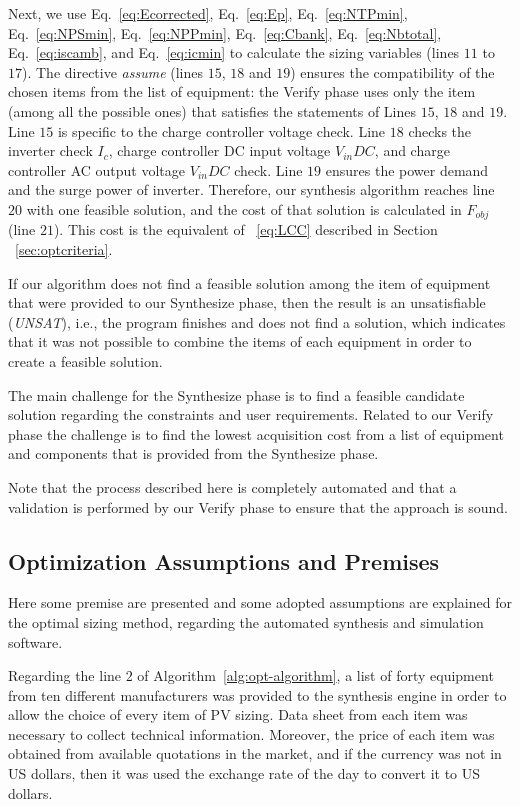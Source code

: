 Next, we use Eq.~\eqref{eq:Ecorrected}, Eq.~\eqref{eq:Ep}, Eq.~\eqref{eq:NTPmin}, 
Eq.~\eqref{eq:NPSmin}, Eq.~\eqref{eq:NPPmin}, Eq.~\eqref{eq:Cbank}, 
Eq.~\eqref{eq:Nbtotal}, Eq.~\eqref{eq:iscamb}, and Eq.~\eqref{eq:icmin} to calculate the sizing variables (lines $11$ to $17$). The directive \textit{assume} (lines $15$, $18$ and $19$) 
ensures the compatibility of the chosen items from the list of equipment: the {\sc Verify} phase 
uses only the item (among all the possible ones) that satisfies the statements of Lines $15$, $18$ and $19$. Line $15$ is specific to the charge controller voltage check. Line $18$ checks the inverter check $I_{c}$, charge controller DC input voltage $V_{in}DC$, and charge controller AC output voltage $V_{in}DC$ check. Line $19$ ensures the power demand and the surge power of inverter.
Therefore, our synthesis algorithm reaches line $20$ with one feasible solution, 
and the cost of that solution is calculated in $F_{obj}$ (line $21$). This cost is the equivalent of ~\ref{eq:LCC} described in Section ~\ref{sec:optcriteria}.

If our algorithm does not find a feasible solution among the item of equipment that 
were provided to our {\sc Synthesize} phase,  then the result is an unsatisfiable (\textit{UNSAT}), i.e., 
the program finishes and does not find a solution, which indicates that it 
was not possible to combine the items of each equipment in order to create a feasible solution. 

The main challenge for the {\sc Synthesize} phase is to find a feasible candidate 
solution regarding the constraints and user requirements. Related to our {\sc Verify} 
phase the challenge is to find the lowest acquisition cost from a list of equipment and 
components that is provided from the {\sc Synthesize} phase. 

Note that the process described here is completely automated and that a validation is performed 
by our {\sc Verify} phase to ensure that the approach is sound.

\subsection{Optimization Assumptions and Premises}
\label{sec:OptAssumptions}

Here some premise are presented and some adopted assumptions are explained for the optimal sizing method, regarding the automated synthesis and simulation software.

Regarding the line $2$ of Algorithm~\ref{alg:opt-algorithm}, 
a list of forty equipment from ten different manufacturers was provided 
to the synthesis engine in order to allow the choice of every item 
of PV sizing. Data sheet from each item was necessary to collect 
technical information. Moreover, the price of each item was obtained 
from available quotations in the market, and if the currency was not in US dollars, 
then it was used the exchange rate of the day to convert it to US dollars.

